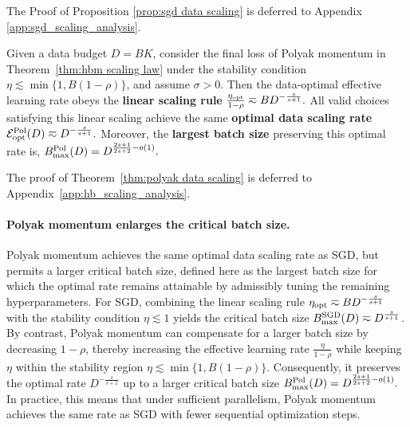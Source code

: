 \documentclass[11pt]{article}
\begin{document}
The Proof of Proposition \ref{prop:sgd data scaling} is deferred to Appendix \ref{app:sgd_scaling_analysis}.

\begin{theorem}
\label{thm:polyak data scaling}
Given a data budget \(D=BK\), consider the final loss of Polyak momentum in Theorem~\ref{thm:hbm scaling law} under the stability condition \(\eta\lesssim\min\{1,B(1-\rho)\}\), and assume \(\sigma>0\).
Then the data-optimal effective learning rate obeys the \textbf{linear scaling rule} \(\frac{\eta_{\rm opt}}{1-\rho}\eqsim B D^{-\frac{s}{s+1}}.\) All valid choices satisfying this linear scaling achieve the same \textbf{optimal data scaling rate} \(\mathcal{E}_{\rm opt}^{\rm Pol}(D)\eqsim D^{-\frac{s}{s+1}}.\) Moreover, the \textbf{largest batch size} preserving this optimal rate is, \(B_{\max}^{\rm Pol}(D)=D^{\frac{2s+1}{2s+2}-o(1)}.\)
\end{theorem}

The proof of Theorem~\ref{thm:polyak data scaling} is deferred to
Appendix~\ref{app:hb_scaling_analysis}.

\paragraph{Polyak momentum enlarges the critical batch size.}
Polyak momentum achieves the same optimal data scaling rate as SGD, but permits a larger critical batch size, defined here as the largest batch size for which the optimal rate remains attainable by admissibly tuning the remaining hyperparameters. For SGD, combining the linear scaling rule \(\eta_{\rm opt}\eqsim B D^{-\frac {s}{s+1}}\) with the stability condition \(\eta\lesssim1\) yields the critical batch size
\(B_{\max}^{\rm SGD}(D)\eqsim D^{\frac{s}{s+1}}\). By contrast, Polyak momentum can compensate for a larger batch size by decreasing \(1-\rho\), thereby increasing the effective learning rate \(\frac{\eta}{1-\rho}\) while keeping \(\eta\) within the stability region \(\eta\lesssim\min\{1,B(1-\rho)\}\). Consequently, it preserves the optimal rate \(D^{-\frac{s}{s+1}}\) up to a larger critical batch size \(B_{\max}^{\rm Pol}(D)=D^{\frac{2s+1}{2s+2}-o(1)}.\) In practice, this means that under sufficient parallelism, Polyak momentum achieves the same rate as SGD with fewer sequential optimization steps.
\end{document}
